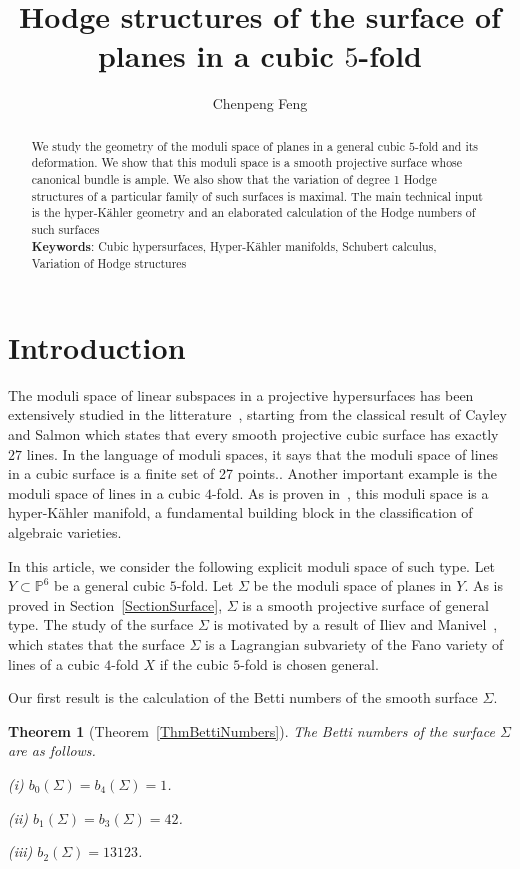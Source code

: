 \documentclass{article}
\title{Hodge structures of the surface of planes in a cubic $5$-fold}
\author{Chenpeng Feng}
\date{}
\newtheorem{theorem}{Theorem}[section]
\theoremstyle{definition}
\begin{document}
\maketitle

\begin{abstract}
    We study the geometry of the moduli space of planes in a general cubic $5$-fold and its deformation. We show that this moduli space is a smooth projective surface whose canonical bundle is ample. We also show that the variation of degree 1 Hodge structures of a particular family of such surfaces is maximal. The main technical input is the hyper-Kähler geometry and an elaborated calculation of the Hodge numbers of such surfaces\\
    \textbf{Keywords}: Cubic hypersurfaces, Hyper-Kähler manifolds, Schubert calculus, Variation of Hodge structures
\end{abstract}
\tableofcontents
\section{Introduction}

The moduli space of linear subspaces in a projective hypersurfaces has been extensively studied in the litterature~\cite{Bai, BD, DM, KCorr}, starting from the classical result of Cayley and Salmon which states that every smooth projective cubic surface has exactly $27$ lines. In the language of moduli spaces, it says that the moduli space of lines in a cubic surface is a finite set of 27 points.. Another important example is the moduli space of lines in a cubic $4$-fold. As is proven in~\cite{BD}, this moduli space is a hyper-Kähler manifold, a fundamental building block in the classification of algebraic varieties.

In this article, we consider the following explicit moduli space of such type. Let $Y\subset \mathbb P^6$ be a general cubic $5$-fold. Let $\Sigma$ be the moduli space of planes in $Y$. As is proved in Section~\ref{SectionSurface}, $\Sigma$ is a smooth projective surface of general type. The study of the surface $\Sigma$ is motivated by a result of Iliev and Manivel~\cite[Proposition 4]{IlievManivel}, which states that the surface $\Sigma$ is a Lagrangian subvariety of the Fano variety of lines of a cubic $4$-fold $X$ if the cubic $5$-fold is chosen general.


Our first result is the calculation of the Betti numbers of the smooth surface $\Sigma$.
\begin{theorem}[Theorem~\ref{ThmBettiNumbers}]\label{ThmBettiNumbersIntro}
    The Betti numbers of the surface $\Sigma$ are as follows.

 (i) $b_0(\Sigma) = b_4(\Sigma) = 1$. 
 
    (ii) $b_1(\Sigma) = b_3(\Sigma) = 42$. 
    
    (iii) $b_2(\Sigma) = 13123$.
\end{theorem}
\end{document}
